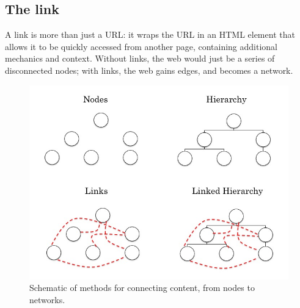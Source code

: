 
\subsection{The link}

A link is more than just a URL: it wraps the URL in an HTML element that allows it to be quickly accessed from another page, containing additional mechanics and context. Without links, the web would just be a series of disconnected nodes; with links, the web gains edges, and becomes a network.

\begin{figure}[ht]
\centering
\includegraphics[width=420pt]{figures/linkedhierarchy}
\caption{Schematic of methods for connecting content, from nodes to networks.}
\label{fig:linkedhierarchy}
\end{figure}

